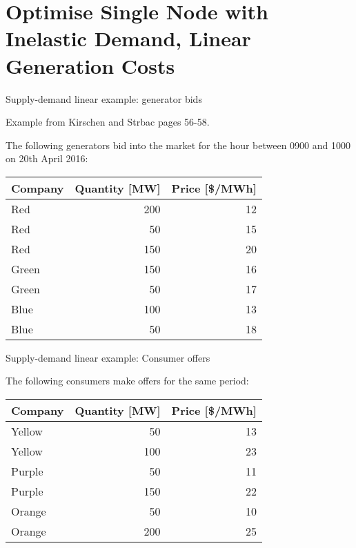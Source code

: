 \documentclass[10pt,dvipsnames]{beamer}
\newcommand{\ra}[1]{\renewcommand{\arraystretch}{#1}}
\begin{document}
\section{Optimise Single Node with Inelastic Demand, Linear Generation Costs}




\begin{frame}{Supply-demand linear example: generator bids}

  Example from Kirschen and Strbac pages 56-58.

  The following generators bid into the market for the hour between 0900 and 1000 on 20th April 2016:
  \ra{1.1}
  \begin{table}[!t]
    \begin{tabular}{lrr}
      \toprule
      Company & Quantity [MW] &  Price [\$/MWh]\\
      \midrule
      Red & 200 & 12 \\
      Red & 50 & 15 \\
      Red & 150 & 20 \\
      Green & 150 & 16 \\
      Green & 50 & 17 \\
      Blue & 100 & 13 \\
      Blue & 50 & 18 \\
      \bottomrule
    \end{tabular}
  \end{table}


\end{frame}



\begin{frame}{Supply-demand linear example: Consumer offers}

  The following consumers make offers for the same period:
  \ra{1.1}
  \begin{table}[!t]
    \begin{tabular}{lrr}
      \toprule
      Company & Quantity [MW] &  Price [\$/MWh]\\
      \midrule
      Yellow & 50 & 13 \\
      Yellow & 100 & 23 \\
      Purple & 50 & 11 \\
      Purple & 150 & 22 \\
      Orange & 50 & 10 \\
      Orange & 200 & 25 \\
      \bottomrule
    \end{tabular}
  \end{table}


\end{frame}
\end{document}
